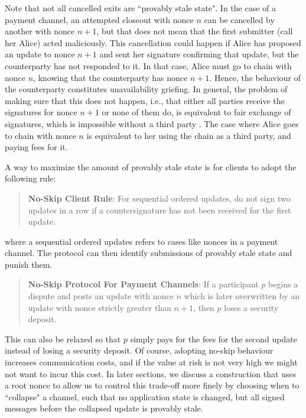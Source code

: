 \documentclass[prb,floatfix,reprint,nofootinbib,amsmath,amssymb,epsfig,pre,floats,letterpaper,groupedaffiliation,tightenlines,allcolors=blue,11pt]{revtex4}
\theoremstyle{definition}
\theoremstyle{definition}
\theoremstyle{definition}
\begin{document}
Note that not all cancelled exits are ``provably stale state". In the case of a payment channel, an attempted closeout with nonce $n$ can be cancelled by another with nonce $n+1$, but that does not mean that the first submitter (call her Alice) acted maliciously. This cancellation could happen if Alice has proposed an update to nonce $n+1$ and sent her signature confirming that update, but the counterparty has not responded to it. In that case, Alice must go to chain with nonce $n$, knowing that the counterparty has nonce $n+1$. Hence, the behaviour of the counterparty constitutes unavailability griefing. In general, the problem of making sure that this does not happen, i.e., that either all parties receive the signatures for nonce $n+1$ or none of them do, is equivalent to fair exchange of signatures, which is impossible without a third party \cite{Pagnia_1999}. The case where Alice goes to chain with nonce $n$ is equivalent to her using the chain as a third party, and paying fees for it.

A way to maximize the amount of provably stale state is for clients to adopt the following rule:

\begin{quote}
\textbf{No-Skip Client Rule}: For sequential ordered updates, do not sign two updates in a row if a countersignature has not been received for the first update.
\end{quote}

where a sequential ordered updates refers to cases like nonces in a payment channel. The protocol can then identify submissions of provably stale state and punish them.

\begin{quote}
\textbf{No-Skip Protocol For Payment Channels}: If a participant $p$ begins a dispute and posts an update with nonce $n$ which is later overwritten by an update with nonce strictly greater than $n+1$, then $p$ loses a security deposit.
\end{quote}

This can also be relaxed so that $p$ simply pays for the fees for the second update instead of losing a security deposit. Of course, adopting no-skip behaviour increases communication costs, and if the value at risk is not very high we might not want to incur this cost. In later sections, we discuss a construction that uses a root nonce to allow us to control this trade-off more finely by choosing when to ``collapse" a channel, such that no application state is changed, but all signed messages before the collapsed update is provably stale.
\end{document}
